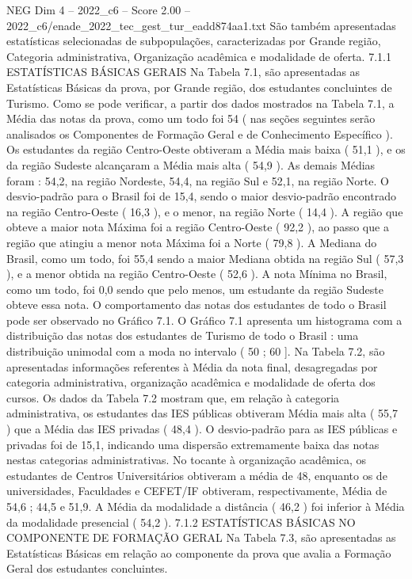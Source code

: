 \begin{textsample}{NEG Dim 4 – 2022\_c6 – Score 2.00 – 2022\_c6/enade\_2022\_tec\_gest\_tur\_eadd874aa1.txt}
São também apresentadas estatísticas selecionadas de subpopulações, caracterizadas por Grande região, Categoria administrativa, Organização acadêmica e modalidade de oferta. 7.1.1 ESTATÍSTICAS BÁSICAS GERAIS Na Tabela 7.1, são apresentadas as Estatísticas Básicas da prova, por Grande região, dos estudantes concluintes de Turismo.
Como se pode verificar, a partir dos dados mostrados na Tabela 7.1, a Média das notas da prova, como um todo foi 54 ( nas seções seguintes serão analisados os Componentes de Formação Geral e de Conhecimento Específico ).
Os estudantes da região Centro-Oeste obtiveram a Média mais baixa ( 51,1 ), e os da região Sudeste alcançaram a Média mais alta ( 54,9 ).
As demais Médias foram : 54,2, na região Nordeste, 54,4, na região Sul e 52,1, na região Norte.
O desvio-padrão para o Brasil foi de 15,4, sendo o maior desvio-padrão encontrado na região Centro-Oeste ( 16,3 ), e o menor, na região Norte ( 14,4 ).
A região que obteve a maior nota Máxima foi a região Centro-Oeste ( 92,2 ), ao passo que a região que atingiu a menor nota Máxima foi a Norte ( 79,8 ).
A Mediana do Brasil, como um todo, foi 55,4 sendo a maior Mediana obtida na região Sul ( 57,3 ), e a menor obtida na região Centro-Oeste ( 52,6 ).
A nota Mínima no Brasil, como um todo, foi 0,0 sendo que pelo menos, um estudante da região Sudeste obteve essa nota.
O comportamento das notas dos estudantes de todo o Brasil pode ser observado no Gráfico 7.1.
O Gráfico 7.1 apresenta um histograma com a distribuição das notas dos estudantes de Turismo de todo o Brasil : uma distribuição unimodal com a moda no intervalo ( 50 ; 60 ].
Na Tabela 7.2, são apresentadas informações referentes à Média da nota final, desagregadas por categoria administrativa, organização acadêmica e modalidade de oferta dos cursos.
Os dados da Tabela 7.2 mostram que, em relação à categoria administrativa, os estudantes das IES públicas obtiveram Média mais alta ( 55,7 ) que a Média das IES privadas ( 48,4 ).
O desvio-padrão para as IES públicas e privadas foi de 15,1, indicando uma dispersão extremamente baixa das notas nestas categorias administrativas.
No tocante à organização acadêmica, os estudantes de Centros Universitários obtiveram a média de 48, enquanto os de universidades, Faculdades e CEFET/IF obtiveram, respectivamente, Média de 54,6 ; 44,5 e 51,9.
A Média da modalidade a distância ( 46,2 ) foi inferior à Média da modalidade presencial ( 54,2 ). 7.1.2 ESTATÍSTICAS BÁSICAS NO COMPONENTE DE FORMAÇÃO GERAL Na Tabela 7.3, são apresentadas as Estatísticas Básicas em relação ao componente da prova que avalia a Formação Geral dos estudantes concluintes.

\end{textsample}
